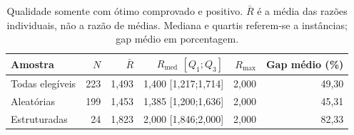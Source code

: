 \begin{table}[htbp]
\centering
\caption{Qualidade somente com ótimo comprovado e positivo. $\bar R$ é a média das razões individuais, não a razão de médias. Mediana e quartis referem-se a instâncias; gap médio em porcentagem.}
\label{tab:quality}
\small
\setlength{\tabcolsep}{4pt}
\begin{tabular}{lrrrrr}
\toprule
Amostra & $N$ & $\bar R$ & $R_{\mathrm{med}}$ $[Q_1;Q_3]$ & $R_{\max}$ & Gap médio (\%) \\
\midrule
Todas elegíveis & 223 & 1,493 & 1,400 [1,217;1,714] & 2,000 & 49,30 \\
Aleatórias & 199 & 1,453 & 1,385 [1,200;1,636] & 2,000 & 45,31 \\
Estruturadas & 24 & 1,823 & 2,000 [1,846;2,000] & 2,000 & 82,33 \\
\bottomrule
\end{tabular}
\end{table}
